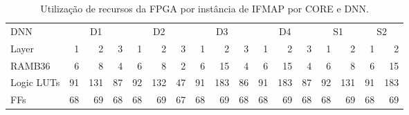 \begin{table}[ht!]
\centering
\caption{Utilização de recursos da FPGA por instância de IFMAP por CORE e DNN.}
\label{tab:5-vivado-ifmap}
\begin{tabular}{lrrrrrrrrrrrrrrrr}
\toprule
DNN & \multicolumn{3}{c}{D1} & \multicolumn{3}{c}{D2} & \multicolumn{3}{c}{D3} & \multicolumn{3}{c}{D4} & \multicolumn{2}{c}{S1} & \multicolumn{2}{c}{S2} \\
\cmidrule(lr){2-4} \cmidrule(lr){5-7} \cmidrule(lr){8-10} \cmidrule(lr){11-13} \cmidrule(lr){14-15} \cmidrule(l){16-17}
Layer & 1 & 2 & 3 & 1 & 2 & 3 & 1 & 2 & 3 & 1 & 2 & 3 & 1 & 2 & 1 & 2 \\
\midrule
RAMB36 &      6 &      8 &      4 &      6 &      8 &      2 &      6 &     15 &      4 &      6 &     15 &      4 &      6 &      8 &      6 &     15 \\
Logic LUTs &         91 &        131 &         87 &         92 &        132 &         47 &         91 &        183 &         86 &         91 &        183 &         87 &         92 &        131 &         91 &        183 \\
FFs &   68 &   69 &   68 &   68 &   69 &   67 &   68 &   69 &   68 &   68 &   69 &   68 &   68 &   69 &   68 &   69 \\
\bottomrule
\end{tabular}
\end{table}